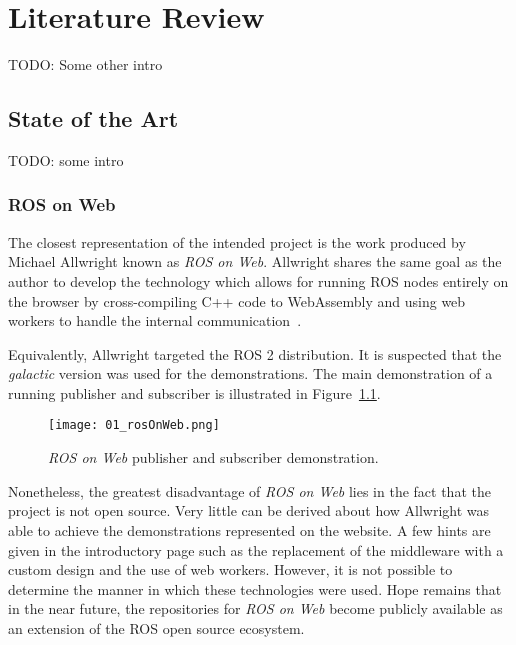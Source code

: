\chapter{Literature Review}\label{cha:literature}

    TODO: Some other intro

\section{State of the Art}

    TODO: some intro

    \subsection{ROS on Web}

        The closest representation of the intended project is the work produced by Michael Allwright known as \textit{ROS on Web}. Allwright shares the same goal as the author to develop the technology which allows for running ROS nodes entirely on the browser by cross-compiling C++ code to WebAssembly and using web workers to handle the internal communication~\cite{rosonweb}.

        Equivalently, Allwright targeted the \ac{ROS} 2 distribution. It is suspected that the \textit{galactic} version was used for the demonstrations. The main demonstration of a running publisher and subscriber is illustrated in Figure~\ref{fig:rosweb}.
        
        
        \begin{figure}[htbp]
            \centering
            \texttt{[image: 01\_rosOnWeb.png]}
            \caption{\textit{ROS on Web} publisher and subscriber demonstration.}
            \label{fig:rosweb}
        \end{figure}

        Nonetheless, the greatest disadvantage of \textit{ROS on Web} lies in the fact that the project is not open source. Very little can be derived about how Allwright was able to achieve the demonstrations represented on the website. A few hints are given in the introductory page such as the replacement of the middleware with a custom design and the use of web workers. However, it is not possible to determine the manner in which these technologies were used. Hope remains that in the near future, the repositories for \textit{ROS on Web} become publicly available as an extension of the ROS open source ecosystem.

